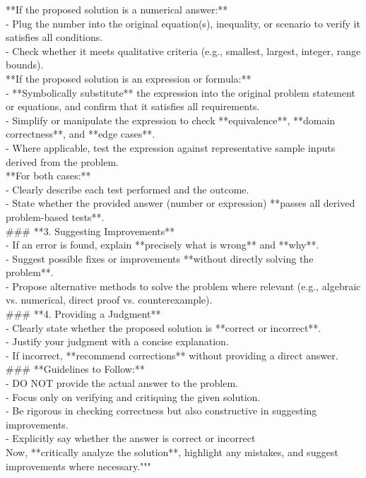 \begin{tcolorbox}
**If the proposed solution is a numerical answer:**\\
- Plug the number into the original equation(s), inequality, or scenario to verify it satisfies all conditions.\\
- Check whether it meets qualitative criteria (e.g., smallest, largest, integer, range bounds).\\

**If the proposed solution is an expression or formula:**\\
- **Symbolically substitute** the expression into the original problem statement or equations, and confirm that it satisfies all requirements.\\
- Simplify or manipulate the expression to check **equivalence**, **domain correctness**, and **edge cases**.\\
- Where applicable, test the expression against representative sample inputs derived from the problem.\\

**For both cases:**\\
- Clearly describe each test performed and the outcome.\\
- State whether the provided answer (number or expression) **passes all derived problem-based tests**.\\

\#\#\# **3. Suggesting Improvements**\\
- If an error is found, explain **precisely what is wrong** and **why**.\\
- Suggest possible fixes or improvements **without directly solving the problem**.\\
- Propose alternative methods to solve the problem where relevant (e.g., algebraic vs. numerical, direct proof vs. counterexample).\\

\#\#\# **4. Providing a Judgment**\\
- Clearly state whether the proposed solution is **correct or incorrect**.\\
- Justify your judgment with a concise explanation.\\
- If incorrect, **recommend corrections** without providing a direct answer.\\

\#\#\# **Guidelines to Follow:**\\
- DO NOT provide the actual answer to the problem.\\
- Focus only on verifying and critiquing the given solution.\\
- Be rigorous in checking correctness but also constructive in suggesting improvements.\\
- Explicitly say whether the answer is correct or incorrect\\

Now, **critically analyze the solution**, highlight any mistakes, and suggest improvements where necessary."""
\end{tcolorbox}

